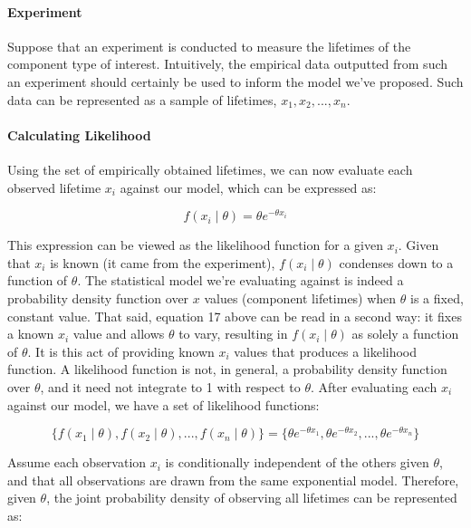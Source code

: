 \documentclass[12pt]{article}
\begin{document}
\paragraph{Experiment}
Suppose that an experiment is conducted to measure the lifetimes of the component type of interest. Intuitively, the empirical data outputted from such an experiment should certainly be used to inform the model we've proposed. Such data can be represented as a sample of lifetimes, $x_1, x_2, ..., x_n$. 

\newpage

\paragraph{Calculating Likelihood}
Using the set of empirically obtained lifetimes, we can now evaluate each observed lifetime $x_i$ against our model, which can be expressed as:

\begin{equation}
 f(x_i \mid \theta) = \theta e^{-\theta x_i}
\end{equation}

\noindent This expression can be viewed as the likelihood function for a given $x_i$. Given that $x_i$ is known (it came from the experiment), $f(x_i \mid \theta)$ condenses down to a function of $\theta$. The statistical model we're evaluating against is indeed a probability density function over $x$ values (component lifetimes) when $\theta$ is a fixed, constant value. That said, equation 17 above can be read in a second way: it fixes a known $x_i$ value and allows $\theta$ to vary, resulting in $f(x_i \mid \theta)$ as solely a function of $\theta$. It is this act of providing known $x_i$ values that produces a likelihood function. A likelihood function is not, in general, a probability density function over $\theta$, and it need not integrate to 1 with respect to $\theta$. After evaluating each $x_i$ against our model, we have a set of likelihood functions:

\begin{equation}
\{f(x_1 \mid \theta), f(x_2 \mid \theta), ..., f(x_n \mid \theta)\} = \{\theta e^{-\theta x_1}, \theta e^{-\theta x_2}, ..., \theta e^{-\theta x_n}\}
\end{equation}

\noindent Assume each observation $x_i$ is conditionally independent of the others given $\theta$, and that all observations are drawn from the same exponential model. Therefore, given $\theta$, the joint probability density of observing all lifetimes can be represented as:
\end{document}
